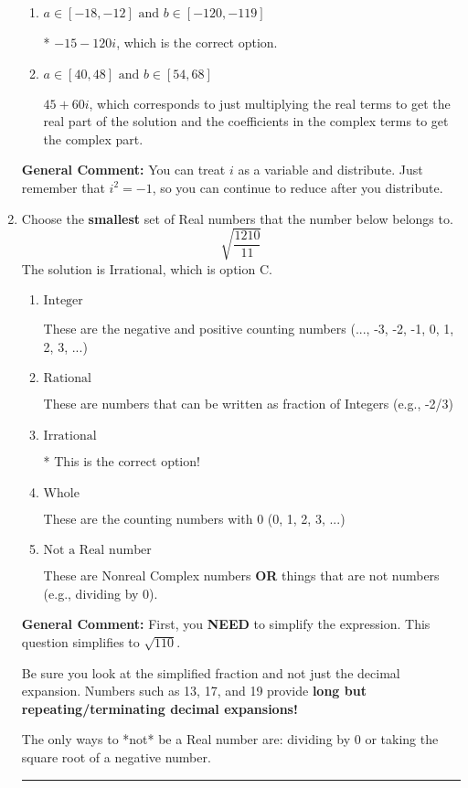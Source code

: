 \documentclass{extbook}[14pt]
\newcommand{\litem}[1]{\item #1

\rule{\textwidth}{0.4pt}}
\begin{document}
\begin{enumerate}
{\begin{enumerate}[label=\Alph*.]
 $-15 + 120 i$, which corresponds to adding a minus sign in both terms.
\item \( a \in [-18, -12] \text{ and } b \in [-120, -119] \)

* $-15 - 120 i$, which is the correct option.
\item \( a \in [40, 48] \text{ and } b \in [54, 68] \)

 $45 + 60 i$, which corresponds to just multiplying the real terms to get the real part of the solution and the coefficients in the complex terms to get the complex part.
\end{enumerate}

\textbf{General Comment:} You can treat $i$ as a variable and distribute. Just remember that $i^2=-1$, so you can continue to reduce after you distribute.
}
\litem{
Choose the \textbf{smallest} set of Real numbers that the number below belongs to.
\[ \sqrt{\frac{1210}{11}} \]The solution is \( \text{Irrational} \), which is option C.\begin{enumerate}[label=\Alph*.]
\item \( \text{Integer} \)

These are the negative and positive counting numbers (..., -3, -2, -1, 0, 1, 2, 3, ...)
\item \( \text{Rational} \)

These are numbers that can be written as fraction of Integers (e.g., -2/3)
\item \( \text{Irrational} \)

* This is the correct option!
\item \( \text{Whole} \)

These are the counting numbers with 0 (0, 1, 2, 3, ...)
\item \( \text{Not a Real number} \)

These are Nonreal Complex numbers \textbf{OR} things that are not numbers (e.g., dividing by 0).
\end{enumerate}

\textbf{General Comment:} First, you \textbf{NEED} to simplify the expression. This question simplifies to $\sqrt{110}$. 
 
 Be sure you look at the simplified fraction and not just the decimal expansion. Numbers such as 13, 17, and 19 provide \textbf{long but repeating/terminating decimal expansions!} 
 
 The only ways to *not* be a Real number are: dividing by 0 or taking the square root of a negative number. 
 
}
\end{enumerate}
\end{document}
